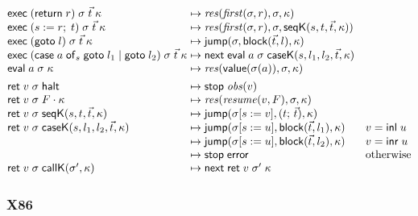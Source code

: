 \documentclass[10pt]{article}
\theoremstyle{acmplain}
\newcommand{\key}[1]{\mathsf{#1}}
\newcommand{\nxt}{\key{next}\;}
\newcommand{\stp}{\key{stop}\;}
\newcommand{\error}{\key{error}}
\newcommand{\obs}{\mathit{obs}}
\newcommand{\inlV}{\key{inl}\;}
\newcommand{\inrV}{\key{inr}\;}
\newcommand{\Kf}[2]{\key{#1}(#2)}
\newcommand{\halt}{\key{halt}}
\newcommand{\assign}[3]{#1 \mathrel{:=} #2;\; #3}
\newcommand{\evi}[3]{\key{eval}\;#1\;#2\;#3}
\newcommand{\rti}[3]{\key{ret}\;#1\;#2\;#3}
\newcommand{\exc}[4]{\key{exec}\;#1\;#2\;#3\;#4}
\begin{document}
\[
\begin{array}{@{}l@{\;\mapsto\;}l@{\quad}l@{}}
  \exc{(\key{return}\; r)}{\sigma}{\vec{t}}{\kappa} & \mathit{res}(\mathit{first}(\sigma, r), \sigma, \kappa) \\
  \exc{(\assign{s}{r}{t})}{\sigma}{\vec{t}}{\kappa} &
    \mathit{res}(\mathit{first}(\sigma, r), \sigma, \Kf{seqK}{s, t, \vec{t}, \kappa}) \\
  \exc{(\key{goto}\; l)}{\sigma}{\vec{t}}{\kappa} & \key{jump}(\sigma, \key{block}(\vec{t}, l), \kappa) \\
  \exc{(\key{case}\;a\;\key{of}_{s}\;\key{goto}\;l_1 \mid \key{goto}\;l_2)}{\sigma}{\vec{t}}{\kappa} &
    \nxt \evi{a}{\sigma}{\Kf{caseK}{s, l_1, l_2, \vec{t}, \kappa}} \\
  \evi{a}{\sigma}{\kappa} & \mathit{res}(\key{value}(\sigma(a)), \sigma, \kappa) \\[1ex]
  \rti{v}{\sigma}{\halt} & \stp \obs(v) \\
  \rti{v}{\sigma}{F \cdot \kappa} & \mathit{res}(\mathit{resume}(v, F), \sigma, \kappa) \\
  \rti{v}{\sigma}{\Kf{seqK}{s, t, \vec{t}, \kappa}} & \key{jump}(\sigma[s := v], (t;\, \vec{t}), \kappa) \\
  \rti{v}{\sigma}{\Kf{caseK}{s, l_1, l_2, \vec{t}, \kappa}} & \key{jump}(\sigma[s := u], \key{block}(\vec{t}, l_1), \kappa) & v = \inlV u \\
  & \key{jump}(\sigma[s := u], \key{block}(\vec{t}, l_2), \kappa) & v = \inrV u \\
  & \stp \error & \text{otherwise} \\
  \rti{v}{\sigma}{\Kf{callK}{\sigma', \kappa}} & \nxt \rti{v}{\sigma'}{\kappa}
\end{array}
\]

\subsubsection{X86}\label{sec:machine-x86}
\end{document}
